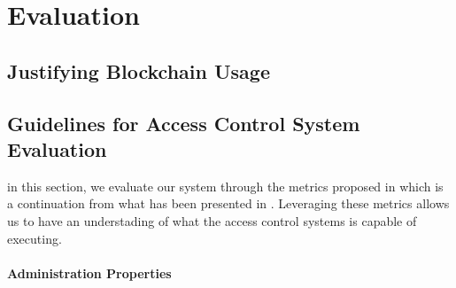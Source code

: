 \chapter{Evaluation}
\label{chap:evaluation}

\section{Justifying Blockchain Usage}

\section{Guidelines for Access Control System Evaluation}

in this section, we evaluate our system through the metrics proposed in \cite{hu_guidelines_2012} which is a continuation from what has been presented in \cite{hu_assessment_2006}. Leveraging these metrics allows us to have an understading of what the access control systems is capable of executing.

\subsubsection{Administration Properties}

